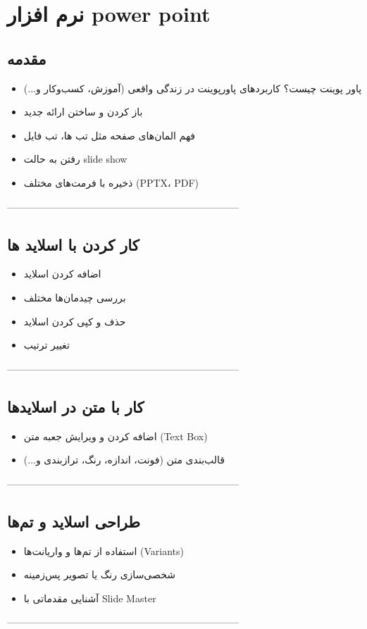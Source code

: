 \chapter{نرم افزار power point}
\section{مقدمه}

\begin{itemize}
\item
پاور پوینت چیست؟ کاربردهای پاورپوینت در زندگی واقعی (آموزش، کسب‌وکار و...)
\item
باز کردن و ساختن ارائه جدید
\item
فهم المان‌های صفحه مثل تب ها، تب فایل
\item
رفتن به حالت slide show
\item
ذخیره با فرمت‌های مختلف (PPTX، PDF)
\end{itemize}
-----------------------------------------------------------------------
\section{کار کردن با اسلاید ‌ها}
\begin{itemize}
\item
اضافه کردن اسلاید
\item
بررسی چیدمان‌ها مختلف
\item
حذف و کپی کردن اسلاید
\item
تغییر ترتیب
\end{itemize}

-----------------------------------------------------------------------
\section{کار با متن در اسلایدها}
\begin{itemize}
\item
اضافه کردن و ویرایش جعبه متن (Text Box)
\item
قالب‌بندی متن (فونت، اندازه، رنگ، ترازبندی و...)
\end{itemize}
-----------------------------------------------------------------------
\section{طراحی اسلاید و تم‌ها}
\begin{itemize}
\item
استفاده از تم‌ها و واریانت‌ها (Variants)
\item
شخصی‌سازی رنگ یا تصویر پس‌زمینه
\item
آشنایی مقدماتی با Slide Master
\end{itemize}
-----------------------------------------------------------------------
